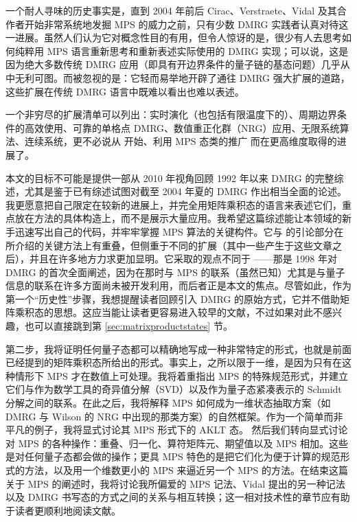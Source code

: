 \documentclass[a4paper,10pt,oneside,onecolumn,1p,times]{elsarticle}
\begin{document}
一个耐人寻味的历史事实是，直到 2004 年前后 Cirac、Verstraete、Vidal 及其合作者开始非常系统地发掘 MPS 的威力之前，只有少数 DMRG 实践者认真对待这一进展。虽然人们认为它对概念性目的有用，但令人惊讶的是，很少有人去思考如何纯粹用 MPS 语言重新思考和重新表述实际使用的 DMRG 实现；可以说，这是因为绝大多数传统 DMRG 应用（即具有开边界条件的量子链的基态问题）几乎从中无利可图。而被忽视的是：它轻而易举地开辟了通往 DMRG 强大扩展的道路，这些扩展在传统 DMRG 语言中既难以看出也难以表述。 

一个非穷尽的扩展清单可以列出：实时演化\cite{Vidal03a,Vidal04b,Daley04,WhiteFeiguin04,VerstraeteRipoll04,Prosen09,Hartmann09,Banuls09}（也包括有限温度下的\cite{VerstraeteRipoll04,Feiguin05a}）、周期边界条件的高效使用\cite{VerstraetePorras04,Pippan10,Pirvu10}、可靠的单格点 DMRG\cite{White05}、数值重正化群（NRG）应用\cite{Weichselbaum09}、无限系统算法\cite{Vidal07,Orus08,McCulloch08}、连续系统\cite{Verstraete10}，更不必说从 \cite{VerstraeteCirac04} 开始、利用 MPS 态类的推广\cite{Nishino01} 而在更高维度取得的进展了。 

本文的目标不可能是提供一部从 2010 年视角回顾 1992 年以来 DMRG 的完整综述，尤其是鉴于已有综述\cite{Schollwoeck05}试图对截至 2004 年夏的 DMRG 作出相当全面的论述。我更愿意把自己限定在较新的进展上，并完全用矩阵乘积态的语言来表述它们，重点放在方法的具体构造上，而不是展示大量应用。我希望这篇综述能让本领域的新手迅速写出自己的代码，并牢牢掌握 MPS 算法的关键构件。它与 \cite{VerstraeteMurg08,McCulloch07} 的引论部分在所介绍的关键方法上有重叠，但侧重于不同的扩展（其中一些产生于这些文章之后），并且在许多地方力求更加显明。它采取的观点不同于 \cite{Peschel98}——那是 1998 年对 DMRG 的首次全面阐述，因为在那时与 MPS 的联系（虽然已知）尤其是与量子信息的联系在许多方面尚未被开发利用，而后者正是本文的焦点。尽管如此，作为第一个``历史性''步骤，我想提醒读者回顾引入 DMRG 的原始方式，它并不借助矩阵乘积态的思想。这应当能让读者更容易进入较早的文献，不过如果对此不感兴趣，也可以直接跳到第 \ref{sec:matrixproductstates} 节。 
 
第二步，我将证明任何量子态都可以精确地写成一种非常特定的形式，也就是前面已经提到的矩阵乘积态所给出的形式。事实上，之所以限于一维，是因为只有在这种情形下 MPS 才在数值上可处理。我将着重指出 MPS 的特殊规范形式，并建立它们与作为数学工具的奇异值分解（SVD）以及作为量子态紧凑表示的 Schmidt 分解之间的联系。在此之后，我将解释 MPS 如何成为一维状态抽取方案（如 DMRG 与 Wilson 的 NRG 中出现的那类方案）的自然框架。作为一个简单而非平凡的例子，我将显式讨论其 MPS 形式下的 AKLT 态。
然后我们转向显式讨论对 MPS 的各种操作：重叠、归一化、算符矩阵元、期望值以及 MPS 相加。这些是对任何量子态都会做的操作；更具 MPS 特色的是把它们化为便于计算的规范形式的方法，以及用一个维数更小的 MPS 来逼近另一个 MPS 的方法。在结束这篇关于 MPS 的阐述时，我将讨论我所偏爱的 MPS 记法、Vidal 提出的另一种记法以及 DMRG 书写态的方式之间的关系与相互转换；这一相对技术性的章节应有助于读者更顺利地阅读文献。
\end{document}
